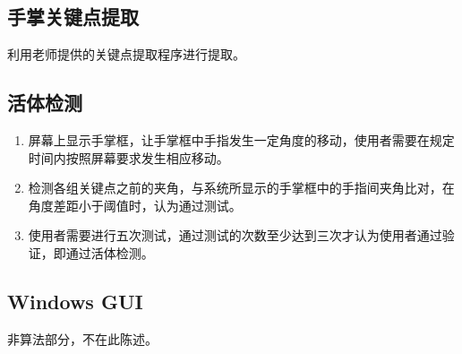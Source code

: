 \documentclass[UTF8]{ctexart}
\begin{document}
	\subsection{手掌关键点提取}
	
		利用老师提供的关键点提取程序进行提取。

	\subsection{活体检测}
		
		\begin{enumerate}
			
			\item 屏幕上显示手掌框，让手掌框中手指发生一定角度的移动，使用者需要在规定时间内按照屏幕要求发生相应移动。 
			
			\item 检测各组关键点之前的夹角，与系统所显示的手掌框中的手指间夹角比对，在角度差距小于阈值时，认为通过测试。
			
			\item 使用者需要进行五次测试，通过测试的次数至少达到三次才认为使用者通过验证，即通过活体检测。
			
		\end{enumerate}
		
	\subsection{Windows GUI}
	
		非算法部分，不在此陈述。
\end{document}
